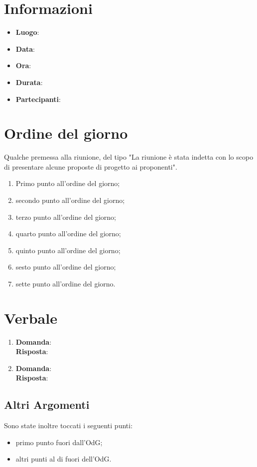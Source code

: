 \documentclass[a4paper,titlepage]{article}
\begin{document}
\maketitle

\newpage
\tableofcontents

\newpage
\section{Informazioni}
\label{sec:Informazioni}

\begin{itemize}
  \item \textbf{Luogo}: 
  \item \textbf{Data}: 
  \item \textbf{Ora}:
  \item \textbf{Durata}:
  \item \textbf{Partecipanti}:
\end{itemize}

\newpage
\section{Ordine del giorno}
\label{sec:OrdineDelGiorno}

Qualche premessa alla riunione, del tipo "La riunione è stata indetta con lo scopo di presentare alcune proposte di progetto ai proponenti".

\begin{enumerate}
  \item Primo punto all'ordine del giorno;
  \item secondo punto all'ordine del giorno;
  \item terzo punto all'ordine del giorno;
  \item quarto punto all'ordine del giorno;
  \item quinto punto all'ordine del giorno;
  \item sesto punto all'ordine del giorno;
  \item sette punto all'ordine del giorno.
\end{enumerate}

\newpage
\section{Verbale}
\label{sec:Verbale}

\begin{enumerate}
  \item \textbf{Domanda}:
		   \\
		   \textbf{Risposta}:
  \item \textbf{Domanda}:
		  \\
		  \textbf{Risposta}:
\end{enumerate}

\subsection{Altri Argomenti}
\label{sub:AltriArgomenti}

Sono state inoltre toccati i seguenti punti:

\begin{itemize}
  \item primo punto fuori dall'OdG;
  \item altri punti al di fuori dell'OdG.
\end{itemize}
\end{document}
